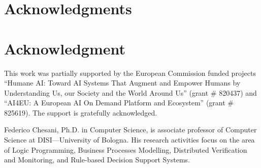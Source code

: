 \documentclass[10pt,journal,compsoc]{IEEEtran}
\theoremstyle{definition}
\theoremstyle{plain}
\begin{document}


%




%




\ifCLASSOPTIONcompsoc
  \section*{Acknowledgments}
\else
  \section*{Acknowledgment}
\fi

This work was partially supported by the European Commission funded projects ``Humane AI: Toward AI Systems That Augment and Empower Humans by Understanding Us, our Society and the World Around Us'' (grant \# 820437) and ``AI4EU: A European AI On Demand Platform and Ecosystem'' (grant \# 825619). The support is gratefully acknowledged.








\begin{IEEEbiography}{Federico Chesani}, 
Ph.D. in Computer Science, is associate professor of Computer Science at DISI---University of Bologna. His research activities focus on the area of Logic Programming, Business Processes Modelling, Distributed Verification and Monitoring, and Rule-based Decision Support Systems.
\end{IEEEbiography}
\end{document}
